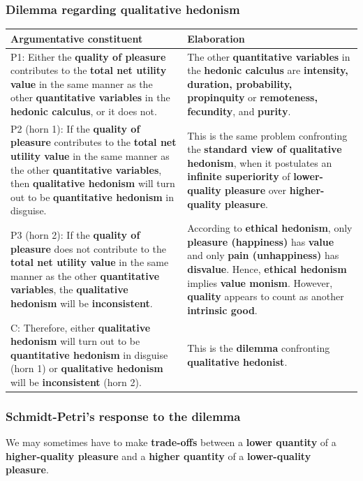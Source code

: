 \documentclass[11pt]{article}
\begin{document}
\subsubsection{Dilemma regarding qualitative hedonism}
\label{sec:orgca80324}
\begin{center}
\begin{tabularx}{\textwidth}{|X|X|}
\hline
Argumentative constituent & Elaboration\\
\hline
P1: Either the \textbf{quality of pleasure} contributes to the \textbf{total net utility value} in the same manner as the other \textbf{quantitative variables} in the \textbf{hedonic calculus}, or it does not. & The other \textbf{quantitative variables} in the \textbf{hedonic calculus} are \textbf{intensity, duration, probability, propinquity} or \textbf{remoteness, fecundity}, and \textbf{purity}.\\
\hline
P2 (horn 1): If the \textbf{quality of pleasure} contributes to the \textbf{total net utility value} in the same manner as the other \textbf{quantitative variables}, then \textbf{qualitative hedonism} will turn out to be \textbf{quantitative hedonism} in disguise. & This is the same problem confronting the \textbf{standard view of qualitative hedonism}, when it postulates an \textbf{infinite superiority} of \textbf{lower-quality pleasure} over \textbf{higher-quality pleasure}.\\
P3 (horn 2): If the \textbf{quality of pleasure} does not contribute to the \textbf{total net utility value} in the same manner as the other \textbf{quantitative variables}, the \textbf{qualitative hedonism} will be \textbf{inconsistent}. & According to \textbf{ethical hedonism}, only \textbf{pleasure (happiness)} has \textbf{value} and only \textbf{pain (unhappiness)} has \textbf{disvalue}. Hence, \textbf{ethical hedonism} implies \textbf{value monism}. However, \textbf{quality} appears to count as another \textbf{intrinsic good}.\\
\hline
C: Therefore, either \textbf{qualitative hedonism} will turn out to be \textbf{quantitative hedonism} in disguise (horn 1) or \textbf{qualitative hedonism} will be \textbf{inconsistent} (horn 2). & This is the \textbf{dilemma} confronting \textbf{qualitative hedonist}.\\
\hline
\end{tabularx}
\end{center}

 \newpage
\subsubsection{Schmidt-Petri's response to the dilemma}
\label{sec:org44ad629}
We may sometimes have to make \textbf{trade-offs} between a \textbf{lower quantity} of a \textbf{higher-quality pleasure} and a \textbf{higher quantity} of a \textbf{lower-quality pleasure}.
\end{document}
